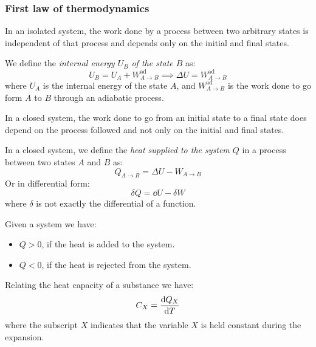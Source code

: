 \documentclass[../../../main.tex]{subfiles}
\begin{document}
\begin{multicols}{2}
    \subsubsection*{First law of thermodynamics}
    \begin{law}
        In an isolated system, the work done by a process between two arbitrary states is independent of that process and depends only on the initial and final states.
    \end{law}
    \begin{corollary}
        We define the \textit{internal energy $U_B$ of the state $B$} as:
        $$U_B=U_A+W_{A\to B}^\text{ad}\implies \Delta U=W_{A\to B}^\text{ad}$$
        where $U_A$ is the internal energy of the state $A$, and $W_{A\to B}^\text{ad}$ is the work done to go form $A$ to $B$ through an adiabatic process.
    \end{corollary}
    \begin{law}
        In a closed system, the work done to go from an initial state to a final state does depend on the process followed and not only on the initial and final states.
    \end{law}
    \begin{corollary}
        In a closed system, we define the \textit{heat supplied to the system $Q$} in a process between two states $A$ and $B$ as:
        $$Q_{A\to B}=\Delta U-W_{A\to B}$$
        Or in differential form:
        $$\delta Q=\dd U-\delta W$$
        where $\delta$ is not exactly the differential of a function.
    \end{corollary}
    \begin{lemma}
        Given a system we have:
        \begin{itemize}
            \item $Q>0$, if the heat is added to the system.
            \item $Q<0$, if the heat is rejected from the system.
        \end{itemize}
    \end{lemma}
    \begin{definition}
        Relating the heat capacity of a substance we have: $$C_X=\dv{Q_X}{T}$$
        where the subscript $X$ indicates that the variable $X$ is held constant during the expansion.
    \end{definition}
    \begin{definition}

\end{definition}
\end{multicols}
\end{document}
